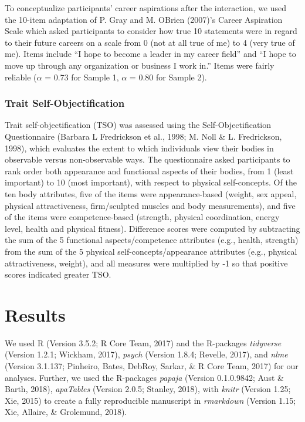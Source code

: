 \documentclass[man]{apa6}
\begin{document}
To conceptualize participants' career aspirations after the interaction,
we used the 10-item adaptation of P. Gray and M. OBrien (2007)'s Career
Aspiration Scale which asked participants to consider how true 10
statements were in regard to their future careers on a scale from 0 (not
at all true of me) to 4 (very true of me). Items include \enquote{I hope
to become a leader in my career field} and \enquote{I hope to move up
through any organization or business I work in.} Items were fairly
reliable (\(\alpha\) = 0.73 for Sample 1, \(\alpha\) = 0.80 for Sample
2).

\subsubsection{Trait
Self-Objectification}\label{trait-self-objectification}

Trait self-objectification (TSO) was assessed using the
Self-Objectification Questionnaire (Barbara L Fredrickson et al., 1998;
M. Noll \& L. Fredrickson, 1998), which evaluates the extent to which
individuals view their bodies in observable versus non-observable ways.
The questionnaire asked participants to rank order both appearance and
functional aspects of their bodies, from 1 (least important) to 10 (most
important), with respect to physical self-concepts. Of the ten body
attributes, five of the items were appearance-based (weight, sex appeal,
physical attractiveness, firm/sculpted muscles and body measurements),
and five of the items were competence-based (strength, physical
coordination, energy level, health and physical fitness). Difference
scores were computed by subtracting the sum of the 5 functional
aspects/competence attributes (e.g., health, strength) from the sum of
the 5 physical self-concepts/appearance attributes (e.g., physical
attractiveness, weight), and all measures were multiplied by -1 so that
positive scores indicated greater TSO.

\section{Results}\label{results}

We used R (Version 3.5.2; R Core Team, 2017) and the R-packages
\emph{tidyverse} (Version 1.2.1; Wickham, 2017), \emph{psych} (Version
1.8.4; Revelle, 2017), and \emph{nlme} (Version 3.1.137; Pinheiro,
Bates, DebRoy, Sarkar, \& R Core Team, 2017) for our analyses. Further,
we used the R-packages \emph{papaja} (Version 0.1.0.9842; Aust \& Barth,
2018), \emph{apaTables} (Version 2.0.5; Stanley, 2018), with
\emph{knitr} (Version 1.25; Xie, 2015) to create a fully reproducible
manuscript in \emph{rmarkdown} (Version 1.15; Xie, Allaire, \&
Grolemund, 2018).
\end{document}
